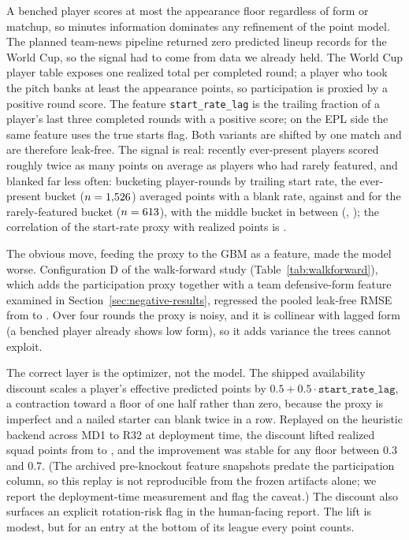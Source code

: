 A benched player scores at most the appearance floor regardless of form
or matchup, so minutes information dominates any refinement of the
point model. The planned team-news pipeline returned zero predicted
lineup records for the World Cup, so the signal had to come from data
we already held. The World Cup player table exposes one realized total
per completed round; a player who took the pitch banks at least the
appearance points, so participation is proxied by a positive round
score. The feature \texttt{start\_rate\_lag} is the trailing fraction
of a player's last three completed rounds with a positive score; on the
EPL side the same feature uses the true starts flag. Both variants are
shifted by one match and are therefore leak-free. The signal is real:
recently ever-present players scored roughly twice as many points on
average as players who had rarely featured, and blanked far less
often: bucketing player-rounds by trailing start rate, the
ever-present bucket ($n = 1{,}526$) averaged \PartHighMean{}
points with a \PartHighBlank{} blank rate, against \PartLowMean{}
and \PartLowBlank{} for the rarely-featured bucket
($n = 613$), with the middle bucket in between
(\PartMidMean{}, \PartMidBlank{}); the correlation of the start-rate
proxy with realized points is \PartStartCorr{}.

The obvious move, feeding the proxy to the GBM as a feature, made the
model worse. Configuration D of the walk-forward study
(Table~\ref{tab:walkforward}), which adds the participation proxy
together with a team defensive-form feature examined in
Section~\ref{sec:negative-results}, regressed the pooled leak-free RMSE
from \WalkforwardPooledC{} to \WalkforwardPooledD{}. Over four rounds
the proxy is noisy, and it is collinear with lagged form (a benched
player already shows low form), so it adds variance the trees cannot
exploit.

The correct layer is the optimizer, not the model. The shipped
availability discount scales a player's effective predicted points by
$0.5 + 0.5 \cdot \texttt{start\_rate\_lag}$, a contraction toward a
floor of one half rather than zero, because the proxy is imperfect and
a nailed starter can blank twice in a row. Replayed on the heuristic
backend across MD1 to R32 at deployment time, the discount lifted
realized squad points from \AvailabilityWithout{} to
\AvailabilityWith{}, and the improvement was stable for any floor
between 0.3 and 0.7. (The archived pre-knockout feature snapshots
predate the participation column, so this replay is not reproducible
from the frozen artifacts alone; we report the deployment-time
measurement and flag the caveat.) The discount also surfaces an explicit
rotation-risk flag in the human-facing report. The lift is modest, but
for an entry at the bottom of its league every point counts.

